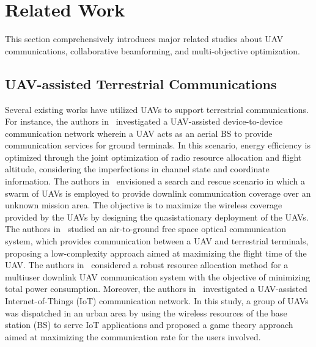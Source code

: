 \section{Related Work}
\label{sec:Related Work}

\par This section comprehensively introduces major related studies about UAV communications, collaborative beamforming, and multi-objective optimization.

\subsection{UAV-assisted Terrestrial Communications}
\label{subsec:UAV-assisted Terrestrial Communications}

\par Several existing works have utilized UAVs to support terrestrial communications. For instance, the authors in~\cite{xu2021robust} investigated a UAV-assisted device-to-device communication network wherein a UAV acts as an aerial BS to provide communication services for ground terminals. In this scenario, energy efficiency is optimized through the joint optimization of radio resource allocation and flight altitude, considering the imperfections in channel state and coordinate information. The authors in~\cite{Gao2022coverage} envisioned a search and rescue scenario in which a swarm of UAVs is employed to provide downlink communication coverage over an unknown mission area. The objective is to maximize the wireless coverage provided by the UAVs by designing the quasistationary deployment of the UAVs. The authors in~\cite{Lee2020aUAV-Mounted} studied an air-to-ground free space optical communication system, which provides communication between a UAV and terrestrial terminals, proposing a low-complexity approach aimed at maximizing the flight time of the UAV. The authors in~\cite{Xu2020multiuser} considered a robust resource allocation method for a multiuser downlink UAV communication system with the objective of minimizing total power consumption. Moreover, the authors in~\cite{Yan2019agametheory} investigated a UAV-assisted Internet-of-Things (IoT) communication network. In this study, a group of UAVs was dispatched in an urban area by using the wireless resources of the base station (BS) to serve IoT applications and proposed a game theory approach aimed at maximizing the communication rate for the users involved.

